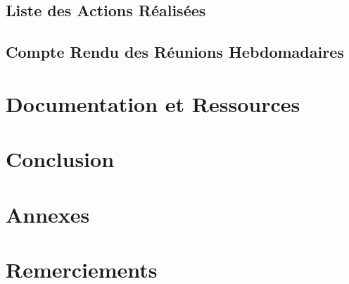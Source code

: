 \documentclass[a4paper,12pt]{report}  %
\begin{document}
	\subsection{Liste des Actions Réalisées}
	
	\subsection{Compte Rendu des Réunions Hebdomadaires}
	
	\section{Documentation et Ressources}
	
	\section{Conclusion}
	
	\section{Annexes}
	
	\section{Remerciements}
	
	
	
%	
%	
%	
	
\end{document}
